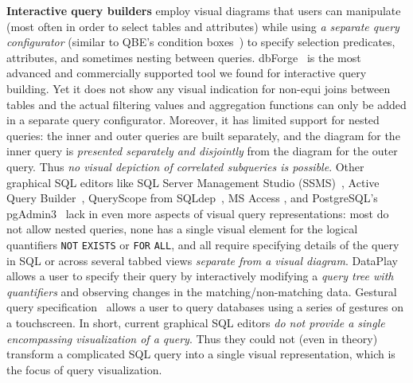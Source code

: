 \documentclass[letterpaper,11pt]{article}
\begin{document}
\textbf{Interactive query builders} employ 
visual diagrams that 
%
users can manipulate (most often in order to select tables and attributes)
%
while using \emph{a separate query configurator}
%
(similar to QBE's condition boxes~\cite{DBLP:journals/ibmsj/Zloof77}) 
to specify selection predicates, attributes, and sometimes nesting between queries.
dbForge~\cite{dbforge} is the most advanced and commercially supported tool we found for interactive query building.
Yet it does not show any visual indication for non-equi joins between tables 
and the actual filtering values and aggregation functions can only be added in a separate query configurator.
Moreover, it has limited support for nested queries: 
the inner and outer queries are built separately,
and the diagram for the inner query is \emph{presented separately and disjointly} 
from the diagram for the outer query.
Thus  \emph{no visual depiction of correlated subqueries is possible}.
%
Other graphical SQL editors like SQL Server Management Studio (SSMS)~\cite{ssms}, Active Query Builder~\cite{activequerybuilder}, QueryScope from SQLdep~\cite{queryscope}, MS Access \cite{msAccess}, and
PostgreSQL's pgAdmin3~\cite{pgadmin} lack in even more aspects of visual query representations: 
most do not allow nested queries, 
none has a single visual element for the logical quantifiers 
\texttt{NOT} \texttt{EXISTS} or \texttt{FOR} \texttt{ALL},
and all require specifying details of the query in SQL or across several tabbed views 
\emph{separate from a visual diagram}.
%
%
%
%
%
%
DataPlay~\cite{DBLP:conf/uist/AbouziedHS12} 
allows a user to specify their query by interactively modifying a \emph{query tree with quantifiers}
and observing changes in the matching/non-matching data.
%
%
%
%
%
%
%
Gestural query specification~\cite{10.14778/2732240.2732247}
allows a user to query databases using a series of gestures on a touchscreen.
In short, current graphical SQL editors \emph{do not provide a single encompassing visualization of a query}.
%
%
%
%
Thus they could not (even in theory) transform a complicated SQL query
into a single visual representation, which is the focus of query visualization.
%
%











\end{document}
